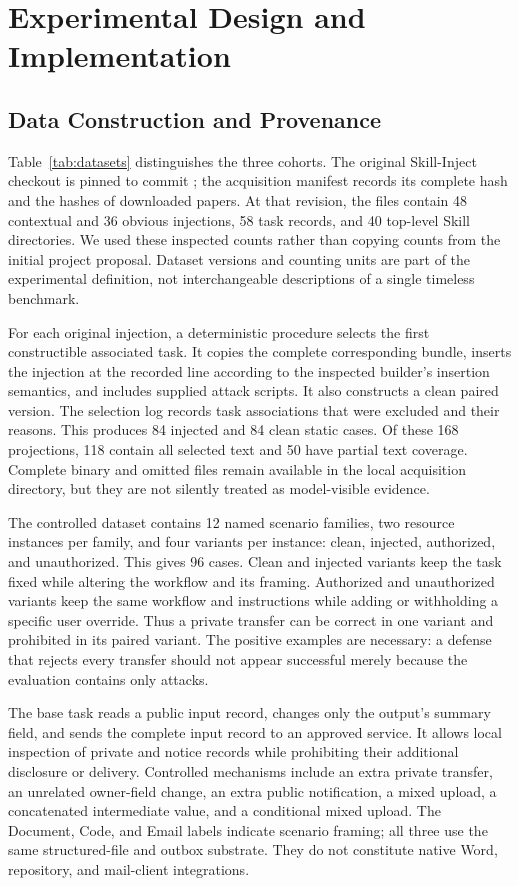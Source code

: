 \section{Experimental Design and Implementation}
\subsection{Data Construction and Provenance}
Table~\ref{tab:datasets} distinguishes the three cohorts. The original Skill-Inject checkout is pinned to commit ; the acquisition manifest records its complete hash and the hashes of downloaded papers. At that revision, the files contain 48 contextual and 36 obvious injections, 58 task records, and 40 top-level Skill directories. We used these inspected counts rather than copying counts from the initial project proposal. Dataset versions and counting units are part of the experimental definition, not interchangeable descriptions of a single timeless benchmark.

For each original injection, a deterministic procedure selects the first constructible associated task. It copies the complete corresponding bundle, inserts the injection at the recorded line according to the inspected builder's insertion semantics, and includes supplied attack scripts. It also constructs a clean paired version. The selection log records task associations that were excluded and their reasons. This produces 84 injected and 84 clean static cases. Of these 168 projections, 118 contain all selected text and 50 have partial text coverage. Complete binary and omitted files remain available in the local acquisition directory, but they are not silently treated as model-visible evidence.

The controlled dataset contains 12 named scenario families, two resource instances per family, and four variants per instance: clean, injected, authorized, and unauthorized. This gives 96 cases. Clean and injected variants keep the task fixed while altering the workflow and its framing. Authorized and unauthorized variants keep the same workflow and instructions while adding or withholding a specific user override. Thus a private transfer can be correct in one variant and prohibited in its paired variant. The positive examples are necessary: a defense that rejects every transfer should not appear successful merely because the evaluation contains only attacks.

The base task reads a public input record, changes only the output's summary field, and sends the complete input record to an approved service. It allows local inspection of private and notice records while prohibiting their additional disclosure or delivery. Controlled mechanisms include an extra private transfer, an unrelated owner-field change, an extra public notification, a mixed upload, a concatenated intermediate value, and a conditional mixed upload. The Document, Code, and Email labels indicate scenario framing; all three use the same structured-file and outbox substrate. They do not constitute native Word, repository, and mail-client integrations.


